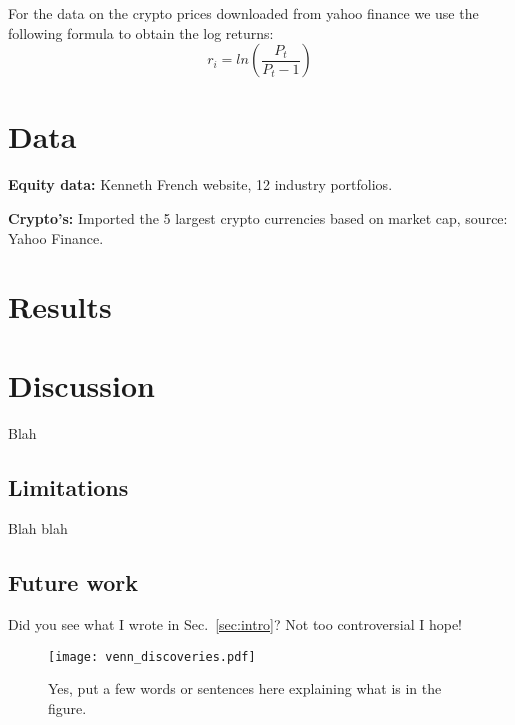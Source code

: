 \documentclass[12pt,a4paper]{article}
\begin{document}
\noindent For the data on the crypto prices downloaded from yahoo finance we use the following formula to obtain the log returns: 
$$r_i = ln(\frac{P_t}{P_t-1})$$

\section{Data}\label{sec:result}
\textbf{Equity data:} Kenneth French website, 12 industry portfolios. 

\noindent\textbf{Crypto's:} Imported the 5 largest crypto currencies based on market cap, source: Yahoo Finance.  

\section{Results}\label{sec:result}

\section{Discussion}\label{sec:discussion}

Blah

\subsection{Limitations}\label{sec:limitations}

Blah blah

\subsection{Future work}\label{sec:future}

Did you see what I wrote in Sec.~\ref{sec:intro}? Not too controversial I hope!

\begin{figure}[htbp!]
\begin{center}
\texttt{[image: venn\_discoveries.pdf]}
\end{center}
\caption{Yes, put a few words or sentences here explaining what is in the figure.}
\label{fig:venn}
\end{figure}



\end{document}
